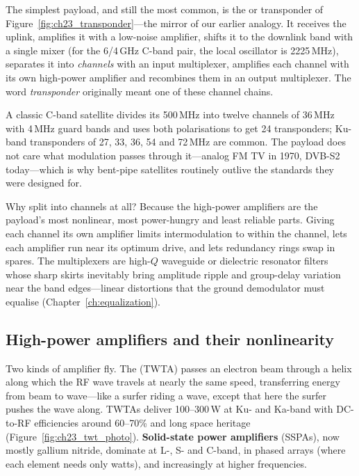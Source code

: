 The simplest payload, and still the most common, is the  or
 transponder of Figure~\ref{fig:ch23_transponder}---the mirror of our earlier
analogy. It receives the uplink, amplifies it with a low-noise amplifier, shifts it to the
downlink band with a single mixer (for the 6/4\,GHz C-band pair, the local oscillator is
2225\,MHz), separates it into \emph{channels} with an input multiplexer, amplifies each channel with
its own high-power amplifier and recombines them in an output multiplexer. The word
\emph{transponder} originally meant one of these channel chains.

A classic C-band satellite divides its 500\,MHz into twelve channels of 36\,MHz with 4\,MHz guard
bands and uses both polarisations to get 24 transponders; Ku-band transponders of 27, 33, 36, 54 and
72\,MHz are common. The payload does not care what modulation passes through it---analog FM TV in
1970, DVB-S2 today---which is why bent-pipe satellites routinely outlive the standards they were
designed for.

Why split into channels at all? Because the high-power amplifiers are the payload's most
nonlinear, most power-hungry and least reliable parts. Giving each channel its own amplifier
limits intermodulation to within the channel, lets each amplifier run near its optimum drive,
and lets redundancy rings swap in spares. The multiplexers are high-$Q$ waveguide or dielectric
resonator filters whose sharp skirts inevitably bring amplitude ripple and group-delay
variation near the band edges---linear distortions that the ground demodulator must equalise
(Chapter~\ref{ch:equalization}).

\subsection{High-power amplifiers and their nonlinearity}

Two kinds of amplifier fly. The  (TWTA) passes an electron
beam through a helix along which the RF wave travels at nearly the same speed, transferring
energy from beam to wave---like a surfer riding a wave, except that here the surfer pushes the wave
along. TWTAs deliver 100--300\,W at Ku- and Ka-band with DC-to-RF efficiencies around 60--70\% and
long space heritage (Figure~\ref{fig:ch23_twt_photo}). \textbf{Solid-state power
amplifiers} (SSPAs), now mostly gallium nitride, dominate at
L-, S- and C-band, in phased arrays (where each element needs only watts), and increasingly at
higher frequencies.

